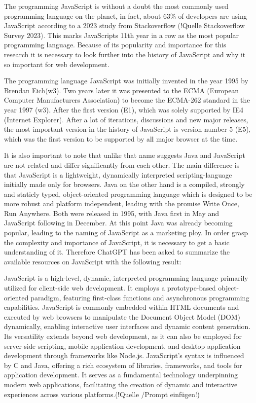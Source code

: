 The programming JavaScript is without a doubt the most commonly used programming language on the planet, in fact, about 63\% of developers are using JavaScript according to a 2023 study from Stackoverflow (!Quelle Stackoverflow Survey 2023). This marks JavaScripts 11th year in a row as the most popular programming language. Because of its popularity and importance for this research it is necessary to look further into the history of JavaScript and why it so important for web development.

The programming language JavaScript was initially invented in the year 1995 by Brendan Eich(w3). Two years later it was presented to the ECMA (European Computer Manufacturers Association) to become the ECMA-262 standard in the year 1997 (w3). After the first version (E1), which was solely supported by IE4 (Internet Explorer).
After a lot of iterations, discussions and new major releases, the most important version in the history of JavaScript is version number 5 (E5), which was the first version to be supported by all major browser at the time.

It is also important to note that unlike that name suggests Java and JavaScript are not related and differ significantly from each other.  The main difference is that JavaScript is a lightweight, dynamically interpreted scripting-language initially made only for browsers. Java on the other hand is a compiled, strongly and staticly typed, object-oriented programming language which is designed to be more robust and platform independent, leading with the promise \dq Write Once, Run Anywhere\dq . Both were released in 1995, with Java first in May and JavaScript following in December. At this point Java was already becoming popular, leading to the naming of JavaScript as a marketing ploy.
In order grasp the complexity and importance of JavaScript, it is necessary to get a basic understanding of it. Therefore ChatGPT has been asked to summarize the available resources on JavaScript with the following result:

\dq JavaScript is a high-level, dynamic, interpreted programming language primarily utilized for client-side web development. It employs a prototype-based object-oriented paradigm, featuring first-class functions and asynchronous programming capabilities. JavaScript is commonly embedded within HTML documents and executed by web browsers to manipulate the Document Object Model (DOM) dynamically, enabling interactive user interfaces and dynamic content generation. Its versatility extends beyond web development, as it can also be employed for server-side scripting, mobile application development, and desktop application development through frameworks like Node.js. JavaScript's syntax is influenced by C and Java, offering a rich ecosystem of libraries, frameworks, and tools for application development. It serves as a fundamental technology underpinning modern web applications, facilitating the creation of dynamic and interactive experiences across various platforms.\dq (!Quelle /Prompt einfügen!)

